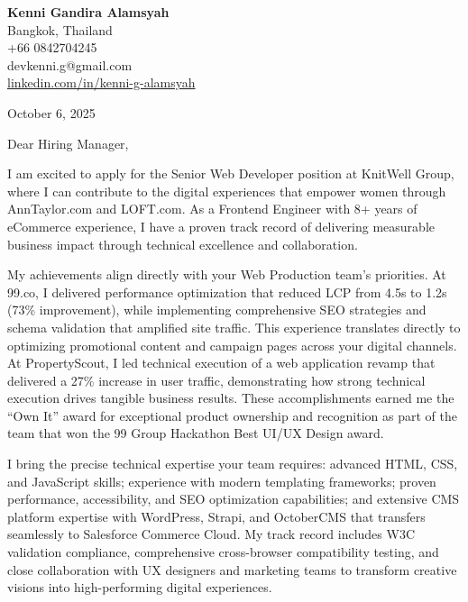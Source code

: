 \documentclass[11pt]{article}
\begin{document}
\begin{flushleft}
\textbf{\Large Kenni Gandira Alamsyah}\\[0.3em]
Bangkok, Thailand\\
+66 0842704245\\
devkenni.g@gmail.com\\
\href{https://www.linkedin.com/in/kenni-g-alamsyah/}{linkedin.com/in/kenni-g-alamsyah}
\end{flushleft}

\vspace{1.5em}

\noindent October 6, 2025

\vspace{1em}

\noindent Dear Hiring Manager,

\vspace{1em}

I am excited to apply for the Senior Web Developer position at KnitWell Group, where I can contribute to the digital experiences that empower women through AnnTaylor.com and LOFT.com. As a Frontend Engineer with 8+ years of eCommerce experience, I have a proven track record of delivering measurable business impact through technical excellence and collaboration.

\vspace{0.8em}

My achievements align directly with your Web Production team's priorities. At 99.co, I delivered performance optimization that reduced LCP from 4.5s to 1.2s (73\% improvement), while implementing comprehensive SEO strategies and schema validation that amplified site traffic. This experience translates directly to optimizing promotional content and campaign pages across your digital channels. At PropertyScout, I led technical execution of a web application revamp that delivered a 27\% increase in user traffic, demonstrating how strong technical execution drives tangible business results. These accomplishments earned me the ``Own It'' award for exceptional product ownership and recognition as part of the team that won the 99 Group Hackathon Best UI/UX Design award.

\vspace{0.8em}

I bring the precise technical expertise your team requires: advanced HTML, CSS, and JavaScript skills; experience with modern templating frameworks; proven performance, accessibility, and SEO optimization capabilities; and extensive CMS platform expertise with WordPress, Strapi, and OctoberCMS that transfers seamlessly to Salesforce Commerce Cloud. My track record includes W3C validation compliance, comprehensive cross-browser compatibility testing, and close collaboration with UX designers and marketing teams to transform creative visions into high-performing digital experiences.
\end{document}
